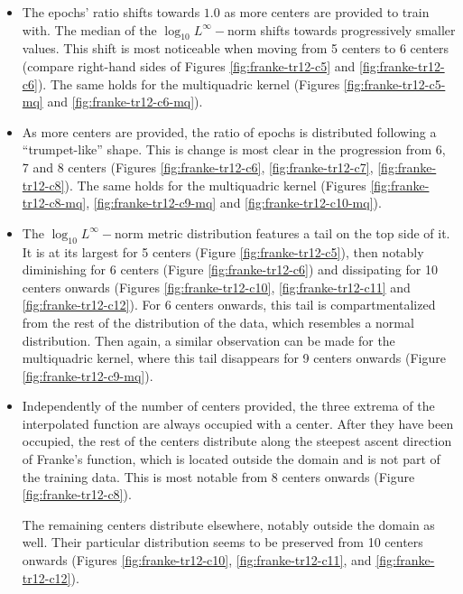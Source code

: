 \documentclass[12pt]{report} %
\begin{document}
\begin{itemize}
  \item The epochs' ratio shifts towards $1.0$ as more centers are
        provided to train with. The median of the $\log_{10}L^\infty-$norm
        shifts towards progressively smaller values. This shift is most noticeable when
        moving from 5 centers to 6 centers (compare right-hand sides of Figures
        \ref{fig:franke-tr12-c5} and \ref{fig:franke-tr12-c6}). The same holds for
        the multiquadric kernel (Figures \ref{fig:franke-tr12-c5-mq} and \ref{fig:franke-tr12-c6-mq}).
  \item As more centers are provided, the ratio of epochs is distributed
        following a ``trumpet-like'' shape. This is change is most clear in the progression
        from 6, 7 and 8 centers (Figures \ref{fig:franke-tr12-c6}, \ref{fig:franke-tr12-c7},
        \ref{fig:franke-tr12-c8}). The same holds for the multiquadric kernel
        (Figures \ref{fig:franke-tr12-c8-mq}, \ref{fig:franke-tr12-c9-mq} and
        \ref{fig:franke-tr12-c10-mq}).
  \item The $\log_{10}L^\infty-$norm metric distribution features a tail on the top
        side of it. It is at its largest for 5 centers (Figure \ref{fig:franke-tr12-c5}),
        then notably diminishing for 6 centers (Figure \ref{fig:franke-tr12-c6})
        and dissipating for 10 centers onwards (Figures \ref{fig:franke-tr12-c10},
        \ref{fig:franke-tr12-c11} and \ref{fig:franke-tr12-c12}). For 6 centers onwards, this tail is compartmentalized from the rest of the
        distribution of the data, which resembles a normal distribution. Then again, a
        similar observation can be made for the multiquadric kernel, where this tail disappears
        for 9 centers onwards (Figure \ref{fig:franke-tr12-c9-mq}).



  \item Independently of the number of centers provided, the three extrema of the
        interpolated function are always occupied with a center. After they have been
        occupied, the rest of the centers distribute along the steepest ascent direction
        of Franke's function, which is located outside the domain and is not part of
        the training data. This is
        most notable from 8 centers onwards (Figure \ref{fig:franke-tr12-c8}).

        The remaining centers distribute elsewhere, notably outside the domain
        as well. Their particular distribution seems to be preserved from 10 centers
        onwards (Figures
        \ref{fig:franke-tr12-c10}, \ref{fig:franke-tr12-c11}, and
        \ref{fig:franke-tr12-c12}).


\end{itemize}
\end{document}
